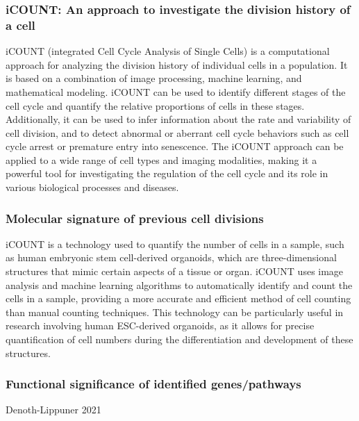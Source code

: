 \begin{itemize}
\begin{itemize}
\subsubsection{iCOUNT: An approach to investigate the division history of a cell}
iCOUNT (integrated Cell Cycle Analysis of Single Cells) is a computational approach for analyzing the division history of individual cells in a population. It is based on a combination of image processing, machine learning, and mathematical modeling. iCOUNT can be used to identify different stages of the cell cycle and quantify the relative proportions of cells in these stages. Additionally, it can be used to infer information about the rate and variability of cell division, and to detect abnormal or aberrant cell cycle behaviors such as cell cycle arrest or premature entry into senescence. The iCOUNT approach can be applied to a wide range of cell types and imaging modalities, making it a powerful tool for investigating the regulation of the cell cycle and its role in various biological processes and diseases.
\subsubsection{Molecular signature of previous cell divisions}
iCOUNT is a technology used to quantify the number of cells in a sample, such as human embryonic stem cell-derived organoids, which are three-dimensional structures that mimic certain aspects of a tissue or organ. iCOUNT uses image analysis and machine learning algorithms to automatically identify and count the cells in a sample, providing a more accurate and efficient method of cell counting than manual counting techniques. This technology can be particularly useful in research involving human ESC-derived organoids, as it allows for precise quantification of cell numbers during the differentiation and development of these structures.

\subsubsection{Functional significance of identified genes/pathways}
Denoth-Lippuner 2021


\end{itemize}
\end{itemize}
